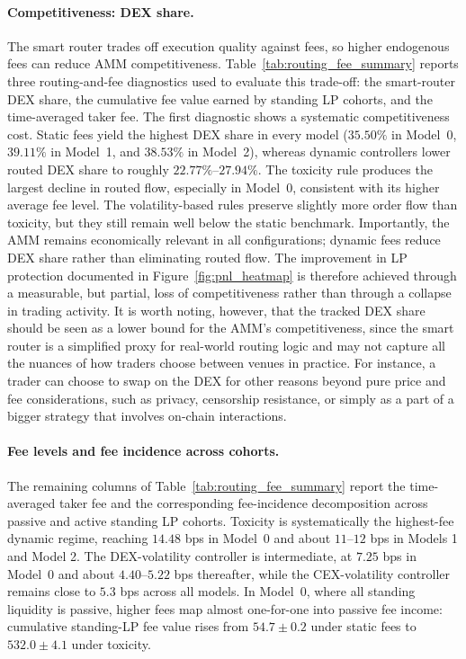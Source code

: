 \documentclass[11pt]{article}
\begin{document}
\paragraph{Competitiveness: DEX share.}
The smart router trades off execution quality against fees, so higher endogenous fees can reduce AMM competitiveness. 
Table~\ref{tab:routing_fee_summary} reports three routing-and-fee diagnostics used to evaluate this trade-off: 
the smart-router DEX share, the cumulative fee value earned by standing LP cohorts, and the time-averaged taker fee. 
The first diagnostic shows a systematic competitiveness cost. Static fees yield the highest DEX share in every model 
(\(35.50\%\) in Model~0, \(39.11\%\) in Model~1, and \(38.53\%\) in Model~2), whereas dynamic controllers lower routed 
DEX share to roughly \(22.77\%\)--\(27.94\%\). The toxicity rule produces the largest decline in routed flow, especially 
in Model~0, consistent with its higher average fee level. The volatility-based rules preserve slightly more order flow 
than toxicity, but they still remain well below the static benchmark. Importantly, the AMM remains economically relevant 
in all configurations; dynamic fees reduce DEX share rather than eliminating routed flow. The improvement in LP protection 
documented in Figure~\ref{fig:pnl_heatmap} is therefore achieved through a measurable, but partial, loss of competitiveness 
rather than through a collapse in trading activity. It is worth noting, however, that the tracked DEX share should be seen 
as a lower bound for the AMM's competitiveness, since the smart router is a simplified proxy for real-world routing logic 
and may not capture all the nuances of how traders choose between venues in practice. For instance, a trader can choose to 
swap on the DEX for other reasons beyond pure price and fee considerations, such as privacy, censorship resistance, or 
simply as a part of a bigger strategy that involves on-chain interactions.

\paragraph{Fee levels and fee incidence across cohorts.}
The remaining columns of Table~\ref{tab:routing_fee_summary} report the time-averaged taker fee and the corresponding 
fee-incidence decomposition across passive and active standing LP cohorts. Toxicity is systematically the highest-fee 
dynamic regime, reaching \(14.48\) bps in Model~0 and about \(11\)--\(12\) bps in Models 1 and Model 2. The DEX-volatility controller 
is intermediate, at \(7.25\) bps in Model~0 and about \(4.40\)--\(5.22\) bps thereafter, while the CEX-volatility controller 
remains close to \(5.3\) bps across all models. In Model~0, where all standing liquidity is passive, higher fees map almost 
one-for-one into passive fee income: cumulative standing-LP fee value rises from \(54.7\pm0.2\) under static fees to 
\(532.0\pm4.1\) under toxicity.
\end{document}
